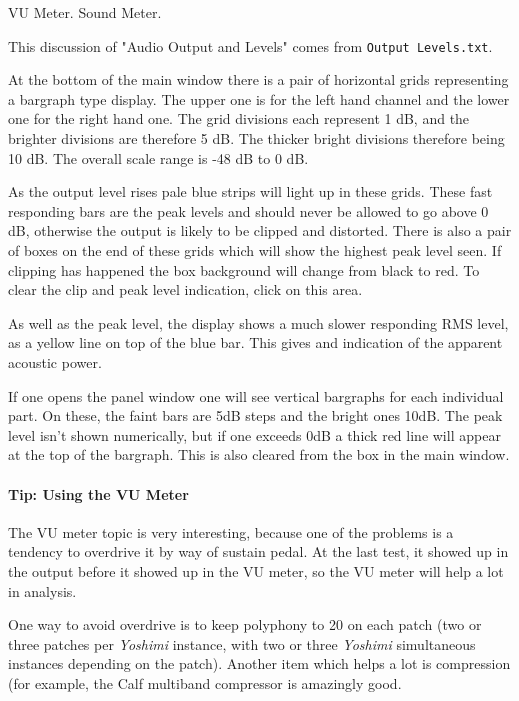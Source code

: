    VU Meter.  Sound Meter.

   This discussion of "Audio Output and Levels"
   comes from \texttt{Output Levels.txt}.

   At the bottom of the main window there is a pair of horizontal grids
   representing a bargraph type display. The upper one is for the left hand
   channel and the lower one for the right hand one. The grid divisions each
   represent 1 dB, and the brighter divisions are therefore 5 dB. The thicker
   bright divisions therefore being 10 dB. The overall scale range is -48 dB to
   0 dB.

   As the output level rises pale blue strips will light up in these grids.
   These fast responding bars are the peak levels and should never be allowed
   to go above 0 dB, otherwise the output is likely to be clipped and distorted.
   There is also a pair of boxes on the end of these grids which will show the
   highest peak level seen. If clipping has happened the box background will
   change from black to red.
   To clear the clip and peak level indication, click on this area.

   As well as the peak level, the display shows a much slower responding RMS
   level, as a yellow line on top of the blue bar. This gives and indication of
   the apparent acoustic power.

   If one opens the panel window one will see vertical bargraphs for each
   individual part. On these, the faint bars are 5dB steps and the bright ones
   10dB. The peak level isn't shown numerically, but if one exceeds 0dB a thick
   red line will appear at the top of the bargraph. This is also cleared from
   the box in the main window.

\paragraph{Tip: Using the VU Meter}
\label{paragraph:tips_using_the_vu_meter}

   The VU meter topic is very interesting, because one of the problems
   is a tendency to overdrive it by way of sustain pedal.  At the last test, it
   showed up in the output before it showed up in the VU meter, so
   the VU meter will help a lot in analysis.

   One way to avoid overdrive is to keep polyphony to 20 on each patch (two
   or three patches per \textsl{Yoshimi} instance, with two or three
   \textsl{Yoshimi} simultaneous instances depending on the patch).
   Another item which helps a lot is compression (for example, the Calf
   multiband compressor is amazingly good.

